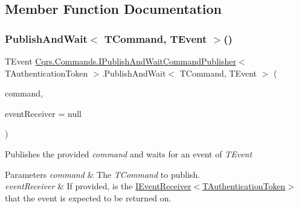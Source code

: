 \subsection{Member Function Documentation}
\mbox{\label{interfaceCqrs_1_1Commands_1_1IPublishAndWaitCommandPublisher_a19ffb318c830e9f05d4adae985232f30_a19ffb318c830e9f05d4adae985232f30}} 
\subsubsection{\texorpdfstring{Publish\+And\+Wait$<$ T\+Command, T\+Event $>$()}{PublishAndWait< TCommand, TEvent >()}\hspace{0.1cm}{\footnotesize\ttfamily [1/6]}}
{\footnotesize\ttfamily T\+Event \hyperlink{interfaceCqrs_1_1Commands_1_1IPublishAndWaitCommandPublisher}{Cqrs.\+Commands.\+I\+Publish\+And\+Wait\+Command\+Publisher}$<$ T\+Authentication\+Token $>$.Publish\+And\+Wait$<$ T\+Command, T\+Event $>$ (\begin{DoxyParamCaption}\item[{T\+Command}]{command,  }\item[{\hyperlink{interfaceCqrs_1_1Events_1_1IEventReceiver}{I\+Event\+Receiver}$<$ T\+Authentication\+Token $>$}]{event\+Receiver = {\ttfamily null} }\end{DoxyParamCaption})}



Publishes the provided {\itshape command}  and waits for an event of {\itshape T\+Event}  


\begin{DoxyParams}{Parameters}
{\em command} & The {\itshape T\+Command}  to publish.\\
\hline
{\em event\+Receiver} & If provided, is the \hyperlink{interfaceCqrs_1_1Events_1_1IEventReceiver}{I\+Event\+Receiver$<$\+T\+Authentication\+Token$>$} that the event is expected to be returned on.\\
\hline
\end{DoxyParams}



